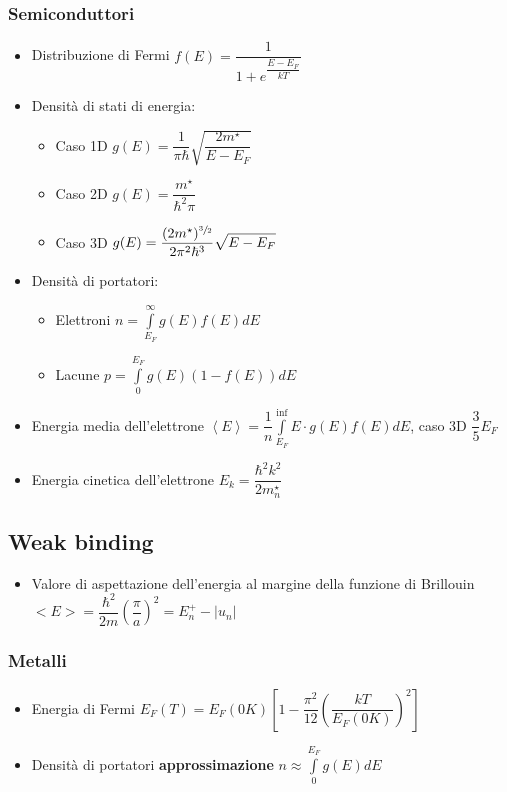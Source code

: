 \documentclass{article}
\begin{document}
\subsubsection{Semiconduttori}
\begin{itemize}
  \item Distribuzione di Fermi \( f(E) = \dfrac{1}{1+e^{\dfrac{E-E_F}{kT}}} \)
  \item Densità di stati di energia:
        \begin{itemize}
          \item Caso 1D \( \displaystyle g(E) = \dfrac{1}{\pi \hbar} \sqrt{\dfrac{2 m^\star}{E-E_F}} \)
          \item Caso 2D \( g(E) = \dfrac{m^\star}{\hbar^ 2 \pi} \)
          \item Caso 3D \( \displaystyle g(E) = \dfrac{(2 m^\star) ^ {\sfrac{3}{2}}}{2 \pi^2 \hbar^3} \sqrt{E-E_F} \)
        \end{itemize}
  \item Densità di portatori:
        \begin{itemize}
          \item Elettroni \( \displaystyle n = \int\limits_{E_F}^{\infty} g(E) f(E) dE \)
          \item Lacune \( \displaystyle p = \int\limits_{0}^{E_F} g(E) \left( 1- f(E) \right) dE \)
        \end{itemize}
  \item Energia media dell'elettrone \( \displaystyle \left<E\right> = \dfrac{1}{n} \int\limits_{E_F}^{\inf} E \cdot g(E) f(E) dE \), caso 3D \(\dfrac{3}{5} E_F \)
  \item Energia cinetica dell'elettrone \( E_k = \dfrac{\hbar^2 k^2}{2 m_n^\star} \)
\end{itemize}

\subsection{Weak binding}
\begin{itemize}
  \item Valore di aspettazione dell'energia al margine della funzione di Brillouin \( < E > = \dfrac{\hbar ^ 2}{2 m} \left(\dfrac{\pi}{a}\right) ^ 2 = E_n^+ - | u_n | \)
\end{itemize}

\subsubsection{Metalli}
\begin{itemize}
  \item Energia di Fermi \( E_F(T) = E_F(0 K) \left[ 1 - \dfrac{\pi ^ 2}{12} \left( \dfrac{kT}{E_F(0 K)}\right) ^ 2\right]\)
  \item Densità di portatori \textbf{approssimazione} \( n \approx \int\limits_{0}^{E_F} g(E) dE \)
\end{itemize}
\end{document}

